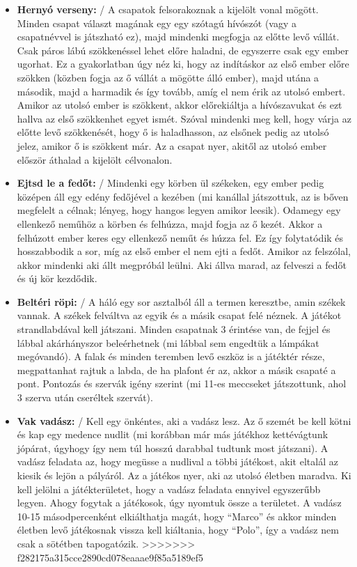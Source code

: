 \documentclass[a4paper, 12pt, twoside, openright]{article}
\begin{document}
\begin{itemize}
\item \textbf{Hernyó verseny:} / A csapatok felsorakoznak a kijelölt vonal mögött. Minden csapat választ magának egy egy szótagú hívószót (vagy a csapatnévvel is játszható ez), majd mindenki megfogja az előtte levő vállát. Csak páros lábú szökkenéssel lehet előre haladni, de egyszerre csak egy ember ugorhat. Ez a gyakorlatban úgy néz ki, hogy az indításkor az első ember előre szökken (közben fogja az ő vállát a mögötte álló ember), majd utána a második, majd a harmadik és így tovább, amíg el nem érik az utolsó embert. Amikor az utolsó ember is szökkent, akkor előrekiáltja a hívószavukat és ezt hallva az első szökkenhet egyet ismét. Szóval mindenki meg kell, hogy várja az előtte levő szökkenését, hogy ő is haladhasson, az elsőnek pedig az utolsó jelez, amikor ő is szökkent már. Az a csapat nyer, akitől az utolsó ember először áthalad a kijelölt célvonalon.

\item \textbf{Ejtsd le a fedőt:} / Mindenki egy körben ül székeken, egy ember pedig középen áll egy edény fedőjével a kezében (mi kanállal játszottuk, az is bőven megfelelt a célnak; lényeg, hogy hangos legyen amikor leesik). Odamegy egy ellenkező neműhöz a körben és felhúzza, majd fogja az ő kezét. Akkor a felhúzott ember keres egy ellenkező neműt és húzza fel. Ez így folytatódik és hosszabbodik a sor, míg az első ember el nem ejti a fedőt. Amikor az felszólal, akkor mindenki aki állt megpróbál leülni. Aki állva marad, az felveszi a fedőt és új kör kezdődik.

\item \textbf{Beltéri röpi:} / A háló egy sor asztalból áll a termen keresztbe, amin székek vannak. A székek felváltva az egyik és a másik csapat felé néznek. A játékot strandlabdával kell játszani. Minden csapatnak 3 érintése van, de fejjel és lábbal akárhányszor beleérhetnek (mi lábbal sem engedtük a lámpákat megóvandó). A falak és minden teremben levő eszköz is a játéktér része, megpattanhat rajtuk a labda, de ha plafont ér az, akkor a másik csapaté a pont. Pontozás és szervák igény szerint (mi 11-es meccseket játszottunk, ahol 3 szerva után cseréltek szervát).

\item \textbf{Vak vadász:} / Kell egy önkéntes, aki a vadász lesz. Az ő szemét be kell kötni és kap egy medence nudlit (mi korábban már más játékhoz kettévágtunk jópárat, úgyhogy így nem túl hosszú darabbal tudtunk most játszani). A vadász feladata az, hogy megüsse a nudlival a többi játékost, akit eltalál az kiesik és lejön a pályáról. Az a játékos nyer, aki az utolsó életben maradva. Ki kell jelölni a játékterületet, hogy a vadász feladata ennyivel egyszerűbb legyen. Ahogy fogytak a játékosok, úgy nyomtuk össze a területet. A vadász 10-15 másodpercenként elkiálthatja magát, hogy “Marco” és akkor minden életben levő játékosnak vissza kell kiáltania, hogy “Polo”, így a vadász nem csak a sötétben tapogatózik.
>>>>>>> f282175a315cce2890cd078eaaae9f85a5189ef5


\end{itemize}
\end{document}
